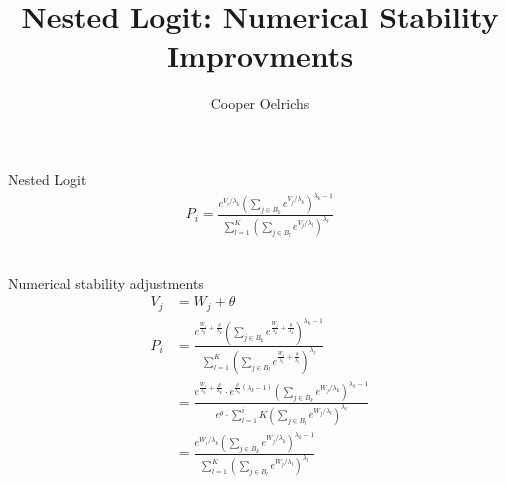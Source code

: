 \documentclass[20pt]{extarticle}
\begin{document}
\title{Nested Logit: Numerical Stability Improvments}
\author{Cooper Oelrichs}

Nested Logit
\begin{align}
  P_{i}=
  \frac{e^{V_{i}/\lambda_{k}}
  \left(\sum_{j\in B_{k}}e^{V_{j}/\lambda_{k}}\right)
  ^{\lambda_{k}-1}}
  {\sum_{l=1}^{K}\left(\sum_{j\in B_{l}}
  e^{V_{j}/\lambda_{l}}\right)^{\lambda_{l}}}
\end{align}

\\
Numerical stability adjustments
\begin{align}
  V_{j} &= W_{j} + \theta
  \\
  P_{i} &= \frac{
    e^{ \frac{W_{i}}{\lambda_{k}} + \frac{\theta}{\lambda_{k}} }
    \left(\sum_{j\in B_{k}}
    e^{ \frac{W_{j}}{\lambda_{k}} + \frac{\theta}{\lambda_{k}} }
    \right)
    ^{\lambda_{k}-1}
  }
  {
    \sum_{l=1}^{K}\left(\sum_{j\in B_{l}}
    e^{ \frac{W_{j}}{\lambda_{l}} + \frac{\theta}{\lambda_{l}} }
    \right)^{\lambda_{l}}
  }
  \\
  &= \frac{
    e^{ \frac{W_{i}}{\lambda_{k}} + \frac{\theta}{\lambda_{k}} }
    \cdot
    e^{ \frac{\theta}{\lambda_{k}} (\lambda_{k}-1) }
    \left(\sum_{j\in B_{k}}e^{W_{j}/\lambda_{k}}\right)
    ^{\lambda_{k}-1}
  }
  {
    e^\theta \cdot
    {\sum_{l=1}^i{K}\left(\sum_{j\in B_{l}}
    e^{W_{j}/\lambda_{l}}\right)^{\lambda_{l}}}
  }
  \\
  &= \frac{
      e^{ W_{i} / \lambda_{k} }
      \left(\sum_{j\in B_{k}}e^{W_{j}/\lambda_{k}}\right)
      ^{\lambda_{k}-1}
    }
    {
      {\sum_{l=1}^{K}\left(\sum_{j\in B_{l}}
      e^{W_{j}/\lambda_{l}}\right)^{\lambda_{l}}}
    }
\end{align}
\end{document}
